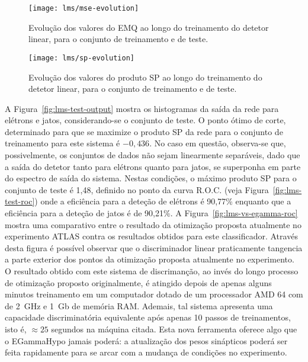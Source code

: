\begin{figure}
\begin{center}
\texttt{[image: lms/mse-evolution]}
\end{center}
\caption{Evolução dos valores do EMQ ao longo do treinamento do detetor
linear, para o conjunto de treinamento e de teste.}
\label{fig:lms-mse-evo}
\end{figure}

\begin{figure}
\begin{center}
\texttt{[image: lms/sp-evolution]}
\end{center}
\caption{Evolução dos valores do produto SP ao longo do treinamento do detetor
linear, para o conjunto de treinamento e de teste.}
\label{fig:lms-sp-evo}
\end{figure}

A Figura~\ref{fig:lms-test-output} mostra os histogramas da saída da rede para
elétrons e jatos, considerando-se o conjunto de teste. O ponto ótimo de corte,
determinado para que se maximize o produto SP da rede para o conjunto de
treinamento para este sistema é $-0,436$. No caso em questão, observa-se que,
possivelmente, os conjuntos de dados não sejam linearmente separáveis, dado
que a saída do detetor tanto para elétrons quanto para jatos, se superponha em
parte do espectro de saída do sistema. Nestas condições, o máximo produto SP
para o conjunto de teste é 1,48, definido no ponto da curva R.O.C. (veja
Figura~\ref{fig:lms-test-roc}) onde a eficiência para a deteção de elétrons é
90,77\% enquanto que a eficiência para a deteção de jatos é de 90,21\%. A
Figura~\ref{fig:lms-vs-egamma-roc} mostra uma comparativo entre o resultado da
otimização proposta atualmente no experimento ATLAS contra os resultados
obtidos para este classificador. Através desta figura é possível observar que
o discriminador linear praticamente tangencia a parte exterior dos pontos da
otimização proposta atualmente no experimento. O resultado obtido com este
sistema de discrimanção, ao invés do longo processo de otimização proposto
originalmente, é atingido depois de apenas alguns minutos treinamento em um
computador dotado de um processador AMD 64 com  de 2~GHz e 1~Gb de
memória RAM. Ademais, tal sistema apresenta uma capacidade discriminatória
equivalente após apenas 10 passos de treinamentos, isto é, $\approx 25$
segundos na máquina citada. Esta nova ferramenta oferece algo que o EGammaHypo
jamais poderá: a atualização dos pesos sinápticos poderá ser feita rapidamente
para se arcar com a mudança de condições no experimento.

